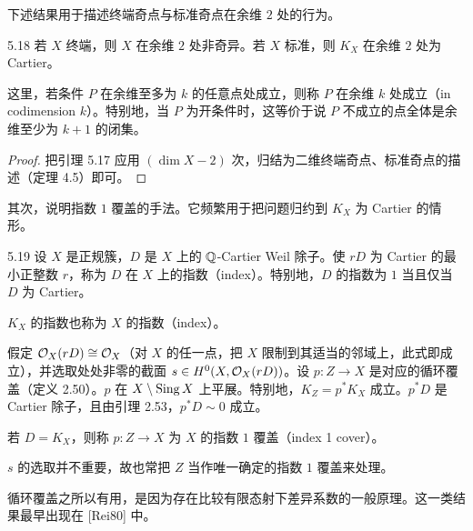 下述结果用于描述终端奇点与标准奇点在余维 $2$ 处的行为。

\begin{corollaryp}{5.18}
若 $X$ 终端，则 $X$ 在余维 $2$ 处非奇异。若 $X$ 标准，则 $K_X$ 在余维 $2$ 处为 Cartier。
\end{corollaryp}

这里，若条件 $P$ 在余维至多为 $k$ 的任意点处成立，则称 $P$ 在余维 $k$ 处成立（in codimension $k$）。特别地，当 $P$ 为开条件时，这等价于说 $P$ 不成立的点全体是余维至少为 $k+1$ 的闭集。

\begin{proof}
把引理 5.17 应用 $(\dim X-2)$ 次，归结为二维终端奇点、标准奇点的描述（定理 4.5）即可。
\end{proof}


其次，说明指数 $1$ 覆盖的手法。它频繁用于把问题归约到 $K_X$ 为 Cartier 的情形。

\begin{definition}{5.19}
设 $X$ 是正规簇，$D$ 是 $X$ 上的 $\mathbb{Q}$-Cartier Weil 除子。使 $rD$ 为 Cartier 的最小正整数 $r$，称为 $D$ 在 $X$ 上的指数（index）。特别地，$D$ 的指数为 $1$ 当且仅当 $D$ 为 Cartier。

$K_X$ 的指数也称为 $X$ 的指数（index）。

假定 $\mathcal{O}_X(rD)\cong\mathcal{O}_X$（对 $X$ 的任一点，把 $X$ 限制到其适当的邻域上，此式即成立），并选取处处非零的截面 $s\in H^0(X,\mathcal{O}_X(rD))$。设 $p\colon Z\to X$ 是对应的循环覆盖（定义 2.50）。$p$ 在 $X\setminus\operatorname{Sing} X$ 上平展。特别地，$K_Z=p^*K_X$ 成立。$p^*D$ 是 Cartier 除子，且由引理 2.53，$p^*D\sim0$ 成立。

若 $D=K_X$，则称 $p\colon Z\to X$ 为 $X$ 的指数 $1$ 覆盖（index 1 cover）。

$s$ 的选取并不重要，故也常把 $Z$ 当作唯一确定的指数 $1$ 覆盖来处理。
\end{definition}


循环覆盖之所以有用，是因为存在比较有限态射下差异系数的一般原理。这一类结果最早出现在 [Rei80] 中。

